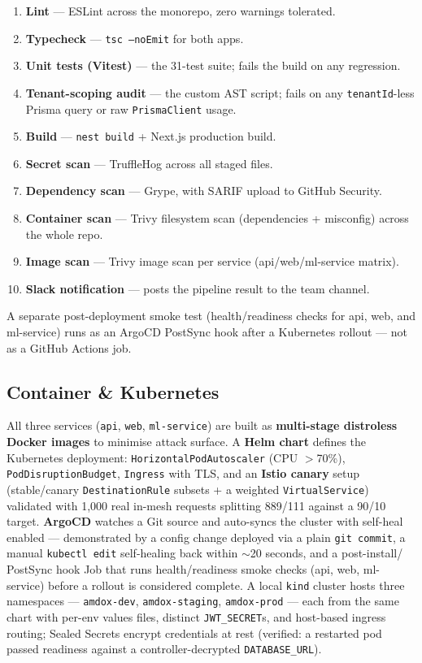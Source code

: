\documentclass[11pt,a4paper]{article}
\newcommand{\code}[1]{\texttt{\small #1}}
\begin{document}
\begin{enumerate}
  \item \textbf{Lint} --- ESLint across the monorepo, zero warnings tolerated.
  \item \textbf{Typecheck} --- \code{tsc --noEmit} for both apps.
  \item \textbf{Unit tests (Vitest)} --- the 31-test suite; fails the build on any
  regression.
  \item \textbf{Tenant-scoping audit} --- the custom AST script; fails on any
  \code{tenantId}-less Prisma query or raw \code{PrismaClient} usage.
  \item \textbf{Build} --- \code{nest build} + Next.js production build.
  \item \textbf{Secret scan} --- TruffleHog across all staged files.
  \item \textbf{Dependency scan} --- Grype, with SARIF upload to GitHub Security.
  \item \textbf{Container scan} --- Trivy filesystem scan (dependencies + misconfig)
  across the whole repo.
  \item \textbf{Image scan} --- Trivy image scan per service (api/web/ml-service matrix).
  \item \textbf{Slack notification} --- posts the pipeline result to the team channel.
\end{enumerate}

A separate post-deployment smoke test (health/readiness checks for api, web, and
ml-service) runs as an ArgoCD PostSync hook after a Kubernetes rollout --- not as a
GitHub Actions job.

\subsection{Container \& Kubernetes}

All three services (\code{api}, \code{web}, \code{ml-service}) are built as
\textbf{multi-stage distroless Docker images} to minimise attack surface. A
\textbf{Helm chart} defines the Kubernetes deployment:
\code{HorizontalPodAutoscaler} (CPU $>$70\%), \code{PodDisruptionBudget},
\code{Ingress} with TLS, and an \textbf{Istio canary} setup (stable/canary
\code{DestinationRule} subsets + a weighted \code{VirtualService}) validated with
1{,}000 real in-mesh requests splitting 889/111 against a 90/10 target.
\textbf{ArgoCD} watches a Git source and auto-syncs the cluster with self-heal enabled
--- demonstrated by a config change deployed via a plain \code{git commit}, a manual
\code{kubectl edit} self-healing back within $\sim$20 seconds, and a post-install/
PostSync hook Job that runs health/readiness smoke checks (api, web, ml-service) before
a rollout is considered complete.
A local \code{kind} cluster hosts three namespaces --- \code{amdox-dev},
\code{amdox-staging}, \code{amdox-prod} --- each from the same chart with per-env
values files, distinct \code{JWT\_SECRET}s, and host-based ingress routing; Sealed
Secrets encrypt credentials at rest (verified: a restarted pod passed readiness against
a controller-decrypted \code{DATABASE\_URL}).
\end{document}
